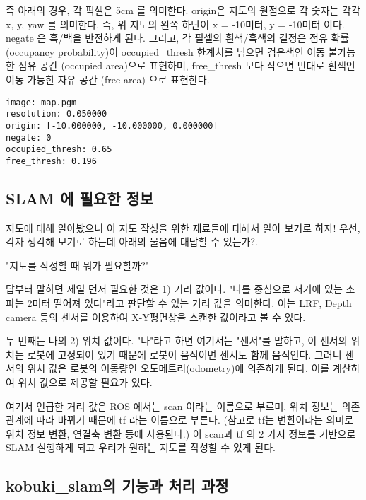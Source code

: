 즉 아래의 경우, 각 픽셀은 5cm 를 의미한다. origin은 지도의 원점으로 각 숫자는 각각 x, y, yaw 를 의미한다. 즉, 위 지도의 왼쪽 하단이 x = -10미터, y = -10미터 이다. negate 은 흑/백을 반전하게 된다. 그리고, 각 필셀의 흰색/흑색의 결정은 점유 확률(occupancy probability)이 occupied\_thresh 한계치를 넘으면 검은색인 이동 불가능한 점유 공간 (occupied area)으로 표현하며, free\_thresh 보다 작으면 반대로 흰색인 이동 가능한 자유 공간 (free area) 으로 표현한다.

\vspace{\baselineskip}
\begin{lstlisting}[language=ROS]
image: map.pgm
resolution: 0.050000
origin: [-10.000000, -10.000000, 0.000000]
negate: 0
occupied_thresh: 0.65
free_thresh: 0.196
\end{lstlisting}


\subsection{SLAM 에 필요한 정보}

지도에 대해 알아봤으니 이 지도 작성을 위한 재료들에 대해서 알아 보기로 하자! 우선, 각자 생각해 보기로 하는데 아래의 물음에 대답할 수 있는가?. 


"지도를 작성할 때 뭐가 필요할까?" 



답부터 말하면 제일 먼저 필요한 것은 1) 거리 값이다. "나를 중심으로 저기에 있는 소파는 2미터 떨어져 있다"라고 판단할 수 있는 거리 값을 의미한다. 이는 LRF, Depth camera 등의 센서를 이용하여 X-Y평면상을 스캔한 값이라고 볼 수 있다.

두 번째는 나의 2) 위치 값이다. "나"라고 하면 여기서는 "센서"를 말하고, 이 센서의 위치는 로봇에 고정되어 있기 때문에 로봇이 움직이면 센서도 함께 움직인다. 그러니 센서의 위치 값은 로봇의 이동량인 오도메트리(odometry)에 의존하게 된다. 이를 계산하여 위치 값으로 제공할 필요가 있다.

여기서 언급한 거리 값은 ROS 에서는 scan 이라는 이름으로 부르며, 위치 정보는 의존 관계에 따라 바뀌기 때문에 tf 라는 이름으로 부른다. (참고로 tf는 변환이라는 의미로 위치 정보 변환,  연결축 변환 등에 사용된다.) 이 scan과 tf 의 2 가지 정보를 기반으로 SLAM 실행하게 되고 우리가 원하는 지도를 작성할 수 있게 된다. 

\subsection{kobuki\_slam의 기능과 처리 과정}

